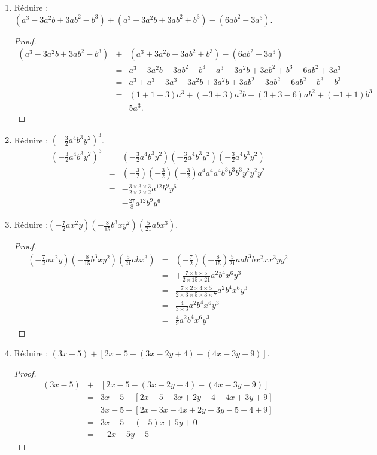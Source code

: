 \documentclass[12 pt]{extarticle}
\theoremstyle{plain}
\begin{document}
\begin{enumerate}
\begin{proof}
\begin{eqnarray*}
   &=& 9 a^2 b^3 c
   \end{eqnarray*}
   \end{proof}
   \item Réduire : $(a^3-3a^2b+3ab^2-b^3) + (a^3+3a^2b+3ab^2+b^3) - (6ab^2-3a^3)$.
   \begin{proof}
   \begin{eqnarray*}
   (a^3-3a^2b+3ab^2-b^3) &+& (a^3+3a^2b+3ab^2+b^3) - (6ab^2-3a^3) \\& = &  a^3-3a^2b+3ab^2-b^3 + a^3+3a^2b+3ab^2+b^3 - 6ab^2 + 3 a^3 \\
   &=& a^3 + a^3 + 3a^3 -3a^2b + 3a^2b + 3ab^2 + 3ab^2 - 6ab^2 -b^3 + b^3 \\
   &=& (1+1+3)a^3 +(-3+3)a^2b +(3+3-6)ab^2 +(-1+1)b^3\\
   &=& 5a^3.
   \end{eqnarray*}
   \end{proof}
   \item Réduire : $\left(-\frac32a^4b^3y^2\right)^3$.
   \begin{eqnarray*}
   \left(-\frac32a^4b^3y^2\right)^3 & = & \left(-\frac32a^4b^3y^2\right)\left(-\frac32a^4b^3y^2\right)\left(-\frac32a^4b^3y^2\right)\\
   &=& \left(-\frac32\right)\left(-\frac32\right)\left(-\frac32\right)
   a^4a^4a^4b^3b^3b^3y^2y^2y^2\\
   &=& -\frac{3\times3\times3}{2\times2\times2} a^{12}b^9y^6\\
   &=& -\frac{27}8a^{12}b^9y^6
   \end{eqnarray*}
   \item Réduire :$\left(-\frac72ax^2y\right)\left(-\frac8{15}b^3xy^2\right)\left(\frac5{21}abx^3\right)$.
   \begin{proof}
   \begin{eqnarray*}
   \left(-\frac72ax^2y\right)\left(-\frac8{15}b^3xy^2\right)\left(\frac5{21}abx^3\right) &=& 
   \left(-\frac72\right)\left(-\frac8{15}\right)\frac5{21}aab^3bx^2xx^3yy^2\\
   &=& + \frac{7\times8\times5}{2\times15\times21} a^2b^4x^6y^3\\
   &=& \frac{7\times2\times4\times5}{2\times3\times5\times3\times7}a^2b^4x^6y^3\\
   &=& \frac{4}{3\times3}a^2b^4x^6y^3\\
   &=& \frac49 a^2b^4x^6y^3
   \end{eqnarray*}
   \end{proof}
   \item Réduire : $(3x-5)+[2x-5 - (3x-2y+4) - (4x-3y-9)]$.
   \begin{proof}
   \begin{eqnarray*}
  (3x-5)&+&[2x-5 - (3x-2y+4) - (4x-3y-9)] \\&=& 3x-5+[2x-5 - 3x+2y-4 - 4x+3y+9]\\ &=& 3x-5+[2x-3x-4x +2y +3y -5 - 4 +9]\\ 
  &=& 3x-5+ (-5)x + 5y +0\\ 
  &=& -2x + 5y - 5 
   \end{eqnarray*}
   \end{proof}
   \end{enumerate}
  
 	
\end{document}
